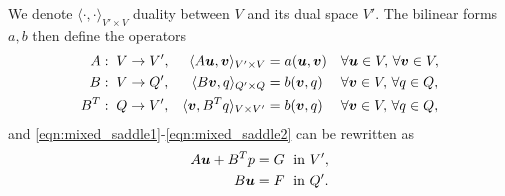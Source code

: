 
\noindent We denote $\langle \cdot, \cdot \rangle_{V'\times V}$ duality between $V$ and its dual space $V'$.
The bilinear forms $a,b$ then define the operators
\begin{equation}
\begin{aligned}
A:\;\;&   V \rightarrow V', & \langle A\mathbf{\boldsymbol{u}},\mathbf{\boldsymbol{v}} \rangle_{V'\times V} =&\; a(\mathbf{\boldsymbol{u}},\mathbf{\boldsymbol{v}}) && \forall \mathbf{\boldsymbol{u}} \in V,\, \forall \mathbf{\boldsymbol{v}} \in V,\\ 
B:\;\;&   V \rightarrow Q', & \langle B \mathbf{\boldsymbol{v}},q    \rangle_{Q'\times Q} =&\; b(\mathbf{\boldsymbol{v}},q)     && \forall \mathbf{\boldsymbol{v}}\in V,\, \forall q \in Q,\\
B^T:\;\;& Q \rightarrow V', & \langle \mathbf{\boldsymbol{v}}, B^T q \rangle_{V\times V'} =&\; b(\mathbf{\boldsymbol{v}},q)     && \forall \mathbf{\boldsymbol{v}}\in V,\, \forall q \in Q,
\end{aligned}
\end{equation}
and \eqref{eqn:mixed_saddle1}-\eqref{eqn:mixed_saddle2} can be rewritten as
\begin{subequations}
\begin{align}
 A\mathbf{\boldsymbol{u}} + B^Tp &= G \;\textrm{  in } V', \label{eqn:mixed_saddle_operator1} \\
 B\mathbf{\boldsymbol{u}} &= F  \;\textrm{  in } Q'. \label{eqn:mixed_saddle_operator2}
\end{align}
\end{subequations}

